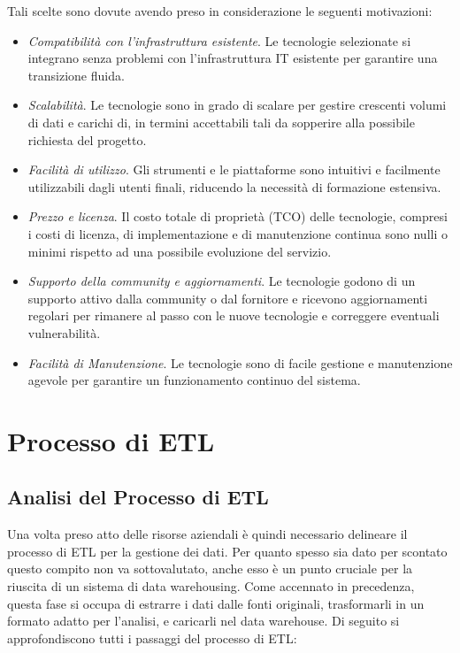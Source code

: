 Tali scelte sono dovute avendo preso in considerazione le seguenti motivazioni:
\begin{itemize}
    \item \textit{Compatibilità con l'infrastruttura esistente}. Le tecnologie selezionate si integrano senza problemi con l'infrastruttura IT esistente per garantire una transizione fluida.
    \item \textit{Scalabilità}. Le tecnologie sono in grado di scalare per gestire crescenti volumi di dati e carichi di, in termini accettabili tali da sopperire alla possibile richiesta del progetto.
    \item \textit{Facilità di utilizzo}. Gli strumenti e le piattaforme sono intuitivi e facilmente utilizzabili dagli utenti finali, riducendo la necessità di formazione estensiva.
    \item \textit{Prezzo e licenza}. Il costo totale di proprietà (TCO) delle tecnologie, compresi i costi di licenza, di implementazione e di manutenzione continua sono nulli o minimi rispetto ad una possibile evoluzione del servizio.
    \item \textit{Supporto della community e aggiornamenti}. Le tecnologie godono di un supporto attivo dalla community o dal fornitore e ricevono aggiornamenti regolari per rimanere al passo con le nuove tecnologie e correggere eventuali vulnerabilità.
    \item \textit{Facilità di Manutenzione}. Le tecnologie sono di facile gestione e manutenzione agevole per garantire un funzionamento continuo del sistema.
\end{itemize}

\section{Processo di ETL}

\subsection{Analisi del Processo di ETL}

Una volta preso atto delle risorse aziendali è quindi necessario delineare il processo di ETL per la gestione dei dati. Per quanto spesso sia dato per scontato questo compito non va sottovalutato, anche esso è un punto cruciale per la riuscita di un sistema di data warehousing. Come accennato in precedenza, questa fase si occupa di estrarre i dati dalle fonti originali, trasformarli in un formato adatto per l'analisi, e caricarli nel data warehouse. Di seguito si approfondiscono tutti i passaggi del processo di ETL:

